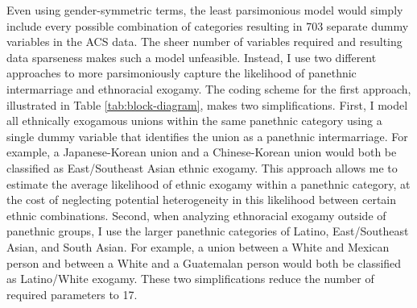 \documentclass[11pt,]{article}
\begin{document}
Even using gender-symmetric terms, the least parsimonious model would simply include every possible combination of categories resulting in 703 separate dummy variables in the ACS data. The sheer number of variables required and resulting data sparseness makes such a model unfeasible. Instead, I use two different approaches to more parsimoniously capture the likelihood of panethnic intermarriage and ethnoracial exogamy. The coding scheme for the first approach, illustrated in Table \ref{tab:block-diagram}, makes two simplifications. First, I model all ethnically exogamous unions within the same panethnic category using a single dummy variable that identifies the union as a panethnic intermarriage. For example, a Japanese-Korean union and a Chinese-Korean union would both be classified as East/Southeast Asian ethnic exogamy. This approach allows me to estimate the average likelihood of ethnic exogamy within a panethnic category, at the cost of neglecting potential heterogeneity in this likelihood between certain ethnic combinations. Second, when analyzing ethnoracial exogamy outside of panethnic groups, I use the larger panethnic categories of Latino, East/Southeast Asian, and South Asian. For example, a union between a White and Mexican person and between a White and a Guatemalan person would both be classified as Latino/White exogamy. These two simplifications reduce the number of required parameters to 17.
\end{document}
